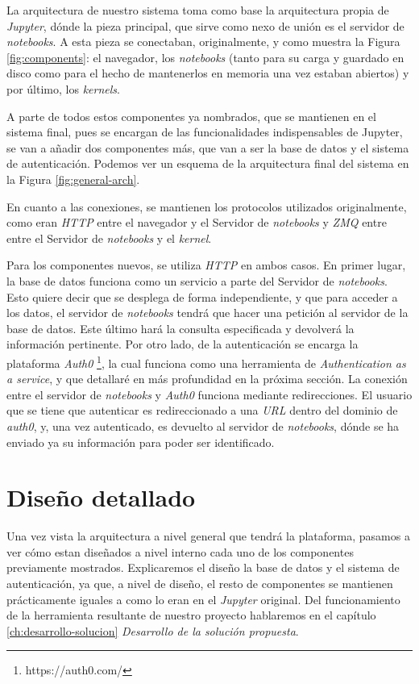 \documentclass[11pt,spanish,listoffigures,listoftables]{tfgetsinf}
\begin{document}
La arquitectura de nuestro sistema toma como base la arquitectura propia de \textit{Jupyter}, dónde la pieza principal, que sirve como nexo de unión es el servidor de \textit{notebooks}. A esta pieza se conectaban, originalmente, y como muestra la Figura \ref{fig:components}: el navegador, los \textit{notebooks} (tanto para su carga y guardado en disco como para el hecho de mantenerlos en memoria una vez estaban abiertos) y por último, los \textit{kernels}.

A parte de todos estos componentes ya nombrados, que se mantienen en el sistema final, pues se encargan de las funcionalidades indispensables de Jupyter, se van a añadir dos componentes más, que van a ser la base de datos y el sistema de autenticación. Podemos ver un esquema de la arquitectura final del sistema en la Figura \ref{fig:general-arch}.

En cuanto a las conexiones, se mantienen los protocolos utilizados originalmente, como eran \textit{HTTP} entre el navegador y el Servidor de \textit{notebooks} y \textit{ZMQ} entre entre el Servidor de \textit{notebooks} y el \textit{kernel}. 

Para los componentes nuevos, se utiliza \textit{HTTP} en ambos casos. En primer lugar, la base de datos funciona como un servicio a parte del Servidor de \textit{notebooks}. Esto quiere decir que se desplega de forma independiente, y que para acceder a los datos, el servidor de \textit{notebooks} tendrá que hacer una petición al servidor de la base de datos. Este último hará la consulta especificada y devolverá la información pertinente. Por otro lado, de la autenticación se encarga la plataforma \textit{Auth0} \footnote{https://auth0.com/}, la cual funciona como una herramienta de \textit{Authentication as a service}, y que detallaré en más profundidad en la próxima sección. La conexión entre el servidor de \textit{notebooks} y \textit{Auth0} funciona mediante redirecciones. El usuario que se tiene que autenticar es redireccionado a una \textit{URL} dentro del dominio de \textit{auth0}, y, una vez autenticado, es devuelto al servidor de \textit{notebooks}, dónde se ha enviado ya su información para poder ser identificado. 



\section{Diseño detallado}
\label{sec:diseno-detallado}

Una vez vista la arquitectura a nivel general que tendrá la plataforma, pasamos a ver cómo estan diseñados a nivel interno cada uno de los componentes previamente mostrados. Explicaremos  el diseño la base de datos y el sistema de autenticación, ya que, a nivel de diseño, el resto de componentes se mantienen prácticamente iguales a como lo eran en el \textit{Jupyter} original. Del funcionamiento de la herramienta resultante de nuestro proyecto hablaremos en el capítulo \ref{ch:desarrollo-solucion} \textit{Desarrollo de la solución propuesta}.
\end{document}
